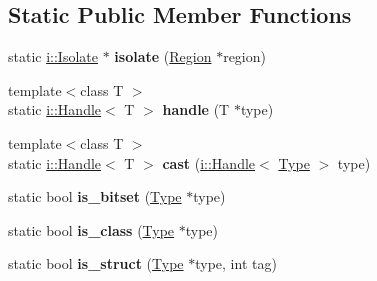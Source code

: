 \subsection*{Static Public Member Functions}
\begin{DoxyCompactItemize}
\item 
\hypertarget{structv8_1_1internal_1_1_heap_type_config_a2b39d51e4abd87f38aaba0d02dfec5bb}{}static \hyperlink{classv8_1_1internal_1_1_isolate}{i\+::\+Isolate} $\ast$ {\bfseries isolate} (\hyperlink{classv8_1_1internal_1_1_isolate}{Region} $\ast$region)\label{structv8_1_1internal_1_1_heap_type_config_a2b39d51e4abd87f38aaba0d02dfec5bb}

\item 
\hypertarget{structv8_1_1internal_1_1_heap_type_config_ae106613fc32c6000b5ef790210caf804}{}{\footnotesize template$<$class T $>$ }\\static \hyperlink{classv8_1_1internal_1_1_handle}{i\+::\+Handle}$<$ T $>$ {\bfseries handle} (T $\ast$type)\label{structv8_1_1internal_1_1_heap_type_config_ae106613fc32c6000b5ef790210caf804}

\item 
\hypertarget{structv8_1_1internal_1_1_heap_type_config_af34017fd289017e326c03ee0837dcc12}{}{\footnotesize template$<$class T $>$ }\\static \hyperlink{classv8_1_1internal_1_1_handle}{i\+::\+Handle}$<$ T $>$ {\bfseries cast} (\hyperlink{classv8_1_1internal_1_1_handle}{i\+::\+Handle}$<$ \hyperlink{classv8_1_1internal_1_1_type_impl}{Type} $>$ type)\label{structv8_1_1internal_1_1_heap_type_config_af34017fd289017e326c03ee0837dcc12}

\item 
\hypertarget{structv8_1_1internal_1_1_heap_type_config_a55de87c7c34e3ac3b749b5b970c6a414}{}static bool {\bfseries is\+\_\+bitset} (\hyperlink{classv8_1_1internal_1_1_type_impl}{Type} $\ast$type)\label{structv8_1_1internal_1_1_heap_type_config_a55de87c7c34e3ac3b749b5b970c6a414}

\item 
\hypertarget{structv8_1_1internal_1_1_heap_type_config_aae90e4ffdb8331b308a1681c5c7a7401}{}static bool {\bfseries is\+\_\+class} (\hyperlink{classv8_1_1internal_1_1_type_impl}{Type} $\ast$type)\label{structv8_1_1internal_1_1_heap_type_config_aae90e4ffdb8331b308a1681c5c7a7401}

\item 
\hypertarget{structv8_1_1internal_1_1_heap_type_config_ab6965e1ff27b644fef3c10f43e1dccf3}{}static bool {\bfseries is\+\_\+struct} (\hyperlink{classv8_1_1internal_1_1_type_impl}{Type} $\ast$type, int tag)\label{structv8_1_1internal_1_1_heap_type_config_ab6965e1ff27b644fef3c10f43e1dccf3}


\end{DoxyCompactItemize}
